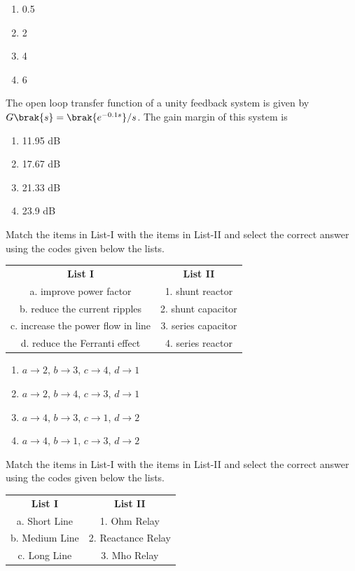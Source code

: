 \begin{enumerate}
\item 0.5
\item 2
\item 4
\item 6
\end{enumerate}
\newpage
\item The open loop transfer function of a unity feedback system is given by $G\brak{s}=\brak{e^{-0.1s}}/s$. The gain margin of this system is
\begin{enumerate}
\item 11.95 dB
\item 17.67 dB
\item 21.33 dB
\item 23.9 dB
\end{enumerate}
\item Match the items in List-I with the items in List-II and select the correct answer using the codes given below the lists.

\begin{tabular}{c c}
\textbf{List I} & \textbf{List II} \\
a. improve power factor & 1. shunt reactor \\
b. reduce the current ripples & 2. shunt capacitor \\
c. increase the power flow in line & 3. series capacitor \\
d. reduce the Ferranti effect & 4. series reactor \\
\end{tabular}

\begin{enumerate}
\item $a \rightarrow 2$, $b \rightarrow 3$, $c \rightarrow 4$, $d \rightarrow 1$
\item $a \rightarrow 2$, $b \rightarrow 4$, $c \rightarrow 3$, $d \rightarrow 1$
\item $a \rightarrow 4$, $b \rightarrow 3$, $c \rightarrow 1$, $d \rightarrow 2$
\item $a \rightarrow 4$, $b \rightarrow 1$, $c \rightarrow 3$, $d \rightarrow 2$
\end{enumerate}
\item Match the items in List-I with the items in List-II and select the correct answer using the codes given below the lists.

\begin{tabular}{c c}
\textbf{List I} & \textbf{List II} \\
a. Short Line & 1. Ohm Relay \\
b. Medium Line & 2. Reactance Relay \\
c. Long Line & 3. Mho Relay \\
\end{tabular}

